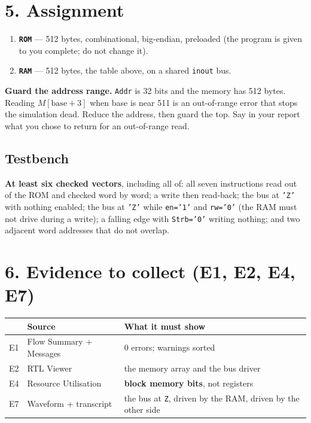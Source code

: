 \documentclass[11pt]{article}
\newcommand{\code}[1]{\texttt{#1}}
\begin{document}
\section*{5. Assignment}

\begin{enumerate}[leftmargin=2em,itemsep=3pt]
\item \textbf{\code{ROM}} --- 512 bytes, combinational, big-endian, preloaded
(the program is given to you complete; do not change it).
\item \textbf{\code{RAM}} --- 512 bytes, the table above, on a shared
\code{inout} bus.
\end{enumerate}

\textbf{Guard the address range.} \code{Addr} is 32 bits and the memory has 512
bytes. Reading $M[\text{base}{+}3]$ when base is near 511 is an out-of-range
error that stops the simulation dead. Reduce the address, then guard the top.
Say in your report what you chose to return for an out-of-range read.

\subsection*{Testbench}

\textbf{At least six checked vectors}, including all of: all seven instructions
read out of the ROM and checked word by word; a write then read-back; the bus at
\code{'Z'} with nothing enabled; the bus at \code{'Z'} while \code{en='1'} and
\code{rw='0'} (the RAM must not drive during a write); a falling edge with
\code{Strb='0'} writing nothing; and two adjacent word addresses that do not
overlap.

\section*{6. Evidence to collect (E1, E2, E4, E7)}

\begin{center}
\begin{tabular}{lll}
\toprule
& Source & What it must show \\
\midrule
E1 & Flow Summary + Messages & 0 errors; warnings sorted \\
E2 & RTL Viewer & the memory array and the bus driver \\
E4 & Resource Utilisation & \textbf{block memory bits}, not registers \\
E7 & Waveform + transcript & the bus at \code{Z}, driven by the RAM, driven by the other side \\
\bottomrule
\end{tabular}
\end{center}
\end{document}
